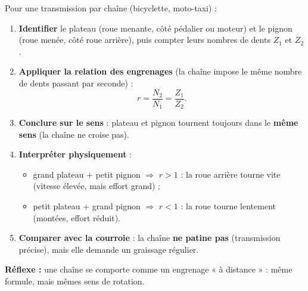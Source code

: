 \documentclass[11pt]{article}
\begin{document}
\begin{methode}
Pour une transmission par chaîne (bicyclette, moto-taxi) :
\begin{enumerate}
\item \textbf{Identifier} le plateau (roue menante, côté pédalier ou moteur) et le pignon (roue menée, côté roue arrière), puis compter leurs nombres de dents $Z_1$ et $Z_2$.
\item \textbf{Appliquer la relation des engrenages} (la chaîne impose le même nombre de dents passant par seconde) :
\[ r = \frac{N_2}{N_1} = \frac{Z_1}{Z_2}. \]
\item \textbf{Conclure sur le sens} : plateau et pignon tournent toujours dans le \textbf{même sens} (la chaîne ne croise pas).
\item \textbf{Interpréter physiquement} :
\begin{itemize}
\item grand plateau + petit pignon $\Rightarrow$ $r > 1$ : la roue arrière tourne vite (vitesse élevée, mais effort grand) ;
\item petit plateau + grand pignon $\Rightarrow$ $r < 1$ : la roue tourne lentement (montées, effort réduit).
\end{itemize}
\item \textbf{Comparer avec la courroie} : la chaîne \textbf{ne patine pas} (transmission précise), mais elle demande un graissage régulier.
\end{enumerate}
\textbf{Réflexe :} une chaîne se comporte comme un engrenage « à distance » : même formule, mais mêmes sens de rotation.
\end{methode}
\end{document}
